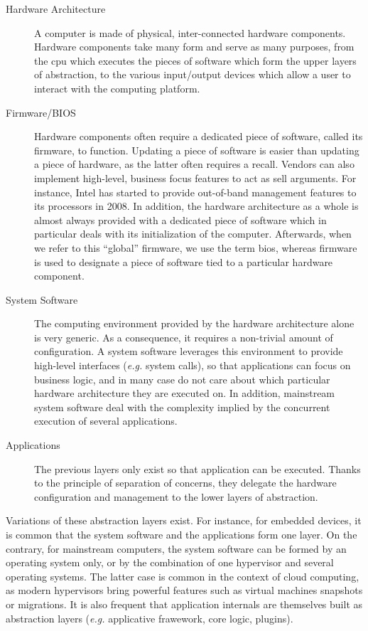 \begin{description}
\item [Hardware Architecture]
  A computer is made of physical, inter-connected hardware components.
  Hardware components take many form and serve as many purposes, from the
  \ac{cpu} which executes the pieces of software which form the upper layers of
  abstraction, to the various input/output devices which allow a user to
  interact with the computing platform.
\item [Firmware/BIOS]
  Hardware components often require a dedicated piece of software, called its
  firmware, to function.
  Updating a piece of software is easier than updating a piece of hardware, as
  the latter often requires a recall.
  Vendors can also implement high-level, business focus features to act as sell
  arguments.
  For instance, Intel has started to provide out-of-band management features to
  its processors in 2008.
  In addition, the hardware architecture as a whole is almost always provided
  with a dedicated piece of software which in particular deals with its
  initialization of the computer.
  Afterwards, when we refer to this ``global'' firmware, we use the term
  \ac{bios}, whereas firmware is used to designate a piece of software tied to a
  particular hardware component.
\item [System Software]
  The computing environment provided by the hardware architecture alone is very
  generic.
  As a consequence, it requires a non-trivial amount of configuration.
  A system software leverages this environment to provide high-level interfaces
  (\emph{e.g.} system calls), so that applications can focus on business logic,
  and in many case do not care about which particular hardware architecture they
  are executed on.
  In addition, mainstream system software deal with the complexity implied by
  the concurrent execution of several applications.
\item [Applications]
  The previous layers only exist so that application can be executed.
  Thanks to the principle of separation of concerns, they delegate the hardware
  configuration and management to the lower layers of abstraction.
\end{description}

Variations of these abstraction layers exist.
%
For instance, for embedded devices, it is common that the system software and
the applications form one layer.
%
On the contrary, for mainstream computers, the system software can be formed by
an operating system only, or by the combination of one hypervisor and several
operating systems.
%
The latter case is common in the context of cloud computing, as modern
hypervisors bring powerful features such as virtual machines snapshots or
migrations.
%
It is also frequent that application internals are themselves built as
abstraction layers (\emph{e.g.} applicative frawework, core logic, plugins).

